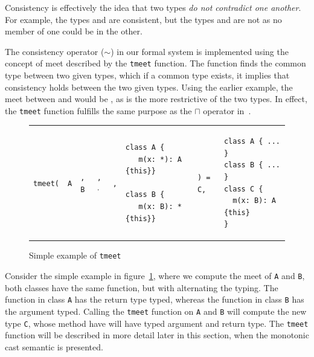 \documentclass[a4paper,USenglish]{tex/lipics-v2016}
\begin{document}
\begin{mathpar}
\end{mathpar}

Consistency is effectively the idea that two types \emph{do not
contradict one another}. For example, the types  and \any are
consistent, but the types  and  are not as no member of
one could be in the other.

The consistency operator ($\sim$) in our formal system is implemented using the concept of meet described
by the \texttt{tmeet} function. The  function finds the common type 
between two given types, which if a common type exists, it implies that consistency holds between 
the two given types. Using the earlier example, the meet between  and \any would be , 
as  is the more restrictive of the two types. In effect, the \texttt{tmeet} function fulfills the 
same purpose as the $\sqcap$ operator in~\cite{Siek2015}. 

\begin{figure}[!ht]
\begin{tabular}{EEEEEVEV}
\texttt{tmeet(}
& \texttt{A}
  & \texttt{,}
  \texttt{B}
  & \texttt{,}
  $\cdot$
  & \texttt{,}
  &
\begin{lstlisting}
class A {
   m(x: *): A {this}}

class B {
   m(x: B): * {this}}
\end{lstlisting}    
& 
\texttt{) = C,}
  &
\begin{lstlisting}
class A { ... }
class B { ... }
class C {
  m(x: B): A {this}
}
\end{lstlisting}    
\end{tabular}
\caption{Simple example of \texttt{tmeet}}
\label{fig:tmeet_ex}
\end{figure}

Consider the simple example in figure~\ref{fig:tmeet_ex}, where we compute the meet of
\texttt{A} and \texttt{B}, both classes have the same function, but with alternating the typing. 
The function in class \texttt{A} has the return type typed, whereas the function in class \texttt{B} has the argument typed. 
Calling the \texttt{tmeet} function on \texttt{A} and \texttt{B} will compute the new type \texttt{C}, 
whose method have will have typed argument and return type. The \texttt{tmeet} function will be described 
in more detail later in this section, when the monotonic cast semantic is presented.
\end{document}
